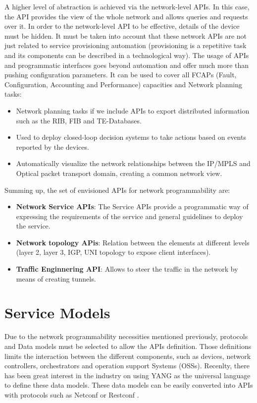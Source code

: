 \documentclass[a4paper,fleqn]{cas-dc}
\begin{document}
A higher level of abstraction is achieved via the network-level APIs. In this case, the API provides the view of the whole network and allows queries and requests over it. In order to the network-level API to be effective, details of the device must be hidden. It must be taken into account that these network APIs are not just related to service provisioning automation (provisioning is a repetitive task and its components can be described in a technological way). The usage of APIs and programmatic interfaces goes beyond automation and offer much more than pushing configuration parameters.  It can be used to cover all FCAPs (Fault, Configuration, Accounting and Performance) capacities and Network planning tasks:
\begin{itemize}
    \item Network planning tasks if we include APIs to export distributed information such as the RIB, FIB and TE-Databases.
    \item Used to deploy closed-loop decision systems to take actions based on events reported by the devices.
    \item Automatically visualize the network relationships between the IP/MPLS and Optical packet transport domain, creating a common network view. 
 \end{itemize}   

Summing up, the set of envisioned APIs for network programmability are:
\begin{itemize}
\item \textbf{Network Service APIs}: The Service APIs provide a programmatic way of expressing the requirements of the service and general guidelines to deploy the service.
\item \textbf{Network topology APis}: Relation between the elements at different levels (layer 2, layer 3, IGP, UNI topology to expose client interfaces). 
\item \textbf{Traffic Enginnering API}: Allows to steer the traffic in the network by means of creating tunnels. 
 \end{itemize}
 
\section{Service Models}
\label{section:models}
Due to the network programmability necessities mentioned previously, protocols and Data models must be selected to allow the APIs definition. Those definitions limits the interaction between the different components, such as devices, network controllers, orchestrators and operation support Systems (OSSs). Recenlty, there has been great interest in the industry on using YANG as the universal language to define these data models. These data models can be easily converted into APIs with protocols such as Netconf or Restconf \cite{pugaczewski2017software}. 
\end{document}

